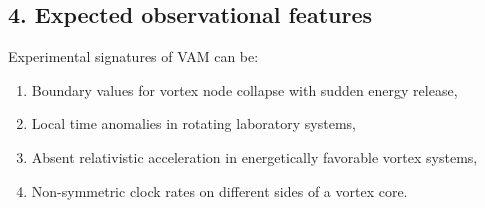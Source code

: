 \subsection{4. Expected observational features}

Experimental signatures of VAM can be:
\begin{enumerate}
    \item Boundary values for vortex node collapse with sudden energy release,
    \item Local time anomalies in rotating laboratory systems,
    \item Absent relativistic acceleration in energetically favorable vortex systems,
    \item Non-symmetric clock rates on different sides of a vortex core.
\end{enumerate}